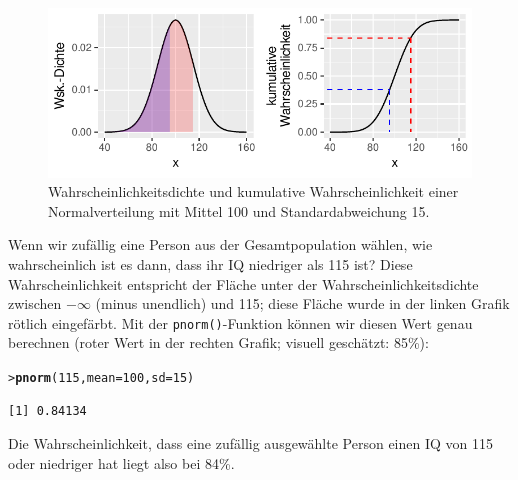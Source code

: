 \documentclass[oneside, 10pt]{book}\usepackage[]{graphicx}\usepackage[]{xcolor}
\makeatletter
\newcommand{\hlnum}[1]{\textcolor[rgb]{0.686,0.059,0.569}{#1}}%
\newcommand{\hlstd}[1]{\textcolor[rgb]{0.345,0.345,0.345}{#1}}%
\newcommand{\hlkwc}[1]{\textcolor[rgb]{0.333,0.667,0.333}{#1}}%
\newcommand{\hlkwd}[1]{\textcolor[rgb]{0.737,0.353,0.396}{\textbf{#1}}}%
\newenvironment{kframe}{%
 \def\at@end@of@kframe{}%
 \ifinner\ifhmode%
  \def\at@end@of@kframe{\end{minipage}}%
  \begin{minipage}{\columnwidth}%
 \fi\fi%
 \def\FrameCommand##1{\hskip\@totalleftmargin \hskip-\fboxsep
 \colorbox{shadecolor}{##1}\hskip-\fboxsep
     \hskip-\linewidth \hskip-\@totalleftmargin \hskip\columnwidth}%
 \MakeFramed {\advance\hsize-\width
   \@totalleftmargin\z@ \linewidth\hsize
   \@setminipage}}%
 {\par\unskip\endMakeFramed%
 \at@end@of@kframe}
\newenvironment{knitrout}{}{} %
\makeatother
\begin{document}
\begin{knitrout}
\color{fgcolor}\begin{figure}[tp]

{\centering \includegraphics[width=.7\textwidth]{figs/unnamed-chunk-125-1} 

}

\caption{Wahrscheinlichkeitsdichte und kumulative Wahrscheinlichkeit einer Normalverteilung mit Mittel 100 und Standardabweichung 15.\label{fig:iqdistribution}}\label{fig:unnamed-chunk-125}
\end{figure}

\end{knitrout}

Wenn wir zufällig eine Person aus der Gesamtpopulation wählen,
wie wahrscheinlich ist es dann, dass ihr IQ niedriger als 115 ist?
Diese Wahrscheinlichkeit entspricht der Fläche unter
der Wahrscheinlichkeitsdichte zwischen $-\infty$ (minus unendlich) und 115;
diese Fläche wurde in der linken Grafik rötlich eingefärbt.
Mit der \texttt{pnorm()}-Funktion können wir diesen Wert genau berechnen
(roter Wert in der rechten Grafik; visuell geschätzt: 85\%):
\begin{knitrout}
\color{fgcolor}\begin{kframe}
\begin{alltt}
\hlstd{> }\hlkwd{pnorm}\hlstd{(}\hlnum{115}\hlstd{,} \hlkwc{mean} \hlstd{=} \hlnum{100}\hlstd{,} \hlkwc{sd} \hlstd{=} \hlnum{15}\hlstd{)}
\end{alltt}
\begin{verbatim}
[1] 0.84134
\end{verbatim}
\end{kframe}
\end{knitrout}

Die Wahrscheinlichkeit, dass eine zufällig ausgewählte Person
einen IQ von 115 oder niedriger hat liegt also bei 84\%.
\end{document}
